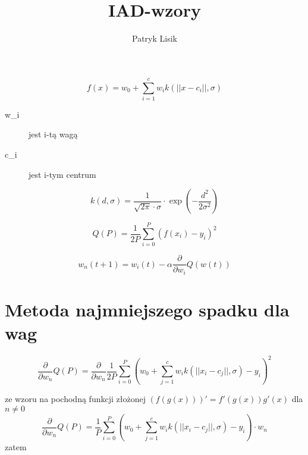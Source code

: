 \documentclass[12pt,a4paper]{article}
\author{Patryk Lisik}
\title{IAD-wzory}
\begin{document}
\maketitle
\begin{equation}\label{eq_1}
f(x)=w_0+\sum^c_{i=1}w_ik(||x-c_i||,\sigma )
\end{equation}
\begin{description}
\item[w_i] jest i-tą wagą
\item[c_i] jest i-tym centrum
\end{description}

\begin{equation}\label{eq_2}
k(d,\sigma)=\frac{1}{\sqrt{2\pi}\cdot\sigma }\cdot \exp\left( -\frac{d^2}{2\sigma ^2}\right) 
\end{equation}

\begin{equation}\label{eq_3}
Q(P)=\frac{1}{2P} \sum^P_{i=0} \left(f(x_i)-y_i\right) ^2
\end{equation}

\begin{equation}\label{eq_4}
w_n(t+1)=w_i(t)-\alpha \frac{\partial}{\partial w_i}Q(w(t))
\end{equation}

\section{Metoda najmniejszego spadku dla wag}

$$
\frac{\partial}{\partial w_n}Q(P)=\frac{\partial}{\partial w_n}\frac{1}{2P} \sum^P_{i=0} \left(w_0+\sum^c_{j=1}w_ik(||x_i-c_j||,\sigma )-y_i\right) ^2
$$

ze wzoru na pochodną funkcji złożonej $\left(f(g(x))\right)'=f'(g(x))g'(x)$
dla $n\neq 0$
$$
\frac{\partial}{\partial w_n}Q(P)=\frac{1}{P} \sum^P_{i=0} \left(w_0+\sum^c_{j=1}w_ik(||x_i-c_j||,\sigma )-y_i\right)\cdot w_n
$$
zatem
\end{document}

